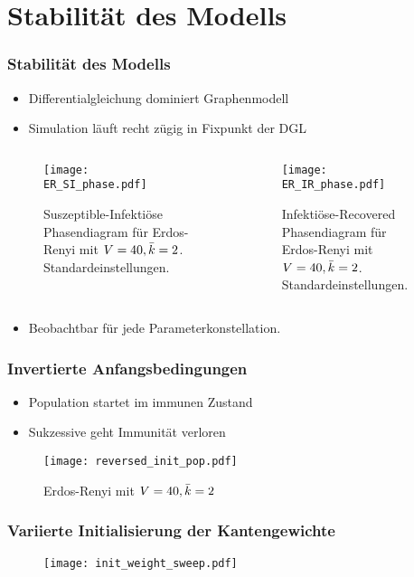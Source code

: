 \section{Stabilität des Modells}
\begin{frame}[t]
    \frametitle{Stabilität des Modells}
    \begin{itemize}
        \item Differentialgleichung dominiert Graphenmodell
        \item Simulation läuft recht zügig in Fixpunkt der DGL
    \end{itemize}
    \begin{columns}
        \begin{column}{0.5\textwidth}
    \begin{figure}[htpb]
        \centering
        \texttt{[image: ER\_SI\_phase.pdf]}
        \caption{Suszeptible-Infektiöse Phasendiagram für Erdos-Renyi mit $V = 40, \bar{k}=2$. Standardeinstellungen.}%
        \label{fig:ER_SI_phase}
    \end{figure}
\end{column}
\begin{column}{0.5\textwidth}
    \begin{figure}[htpb]
        \centering
        \texttt{[image: ER\_IR\_phase.pdf]}
        \caption{Infektiöse-Recovered Phasendiagram für Erdos-Renyi mit $V = 40, \bar{k}=2$.
        Standardeinstellungen.}%
        \label{fig:ER_IR_phase}
    \end{figure}
\end{column}
\end{columns}
\begin{itemize}
    \item<2-> Beobachtbar für jede Parameterkonstellation.
\end{itemize}
\end{frame}
\begin{frame}[t]
    \frametitle{Invertierte Anfangsbedingungen}
    \begin{itemize}
        \item Population startet im immunen Zustand
        \item Sukzessive geht Immunität verloren
    \end{itemize}
    \begin{figure}[htpb]
        \centering
        \texttt{[image: reversed\_init\_pop.pdf]}
        \caption{Erdos-Renyi mit $V = 40, \bar{k} =2$}%
        \label{fig:reversed_init_pop}
    \end{figure}
    
\end{frame}

\begin{frame}[t]
    \frametitle{Variierte Initialisierung der Kantengewichte}
    \begin{figure}[htpb]
        \centering
        \texttt{[image: init\_weight\_sweep.pdf]}
        \caption{}%
        \label{fig:init_weight_sweep}
    \end{figure}
\end{frame}
